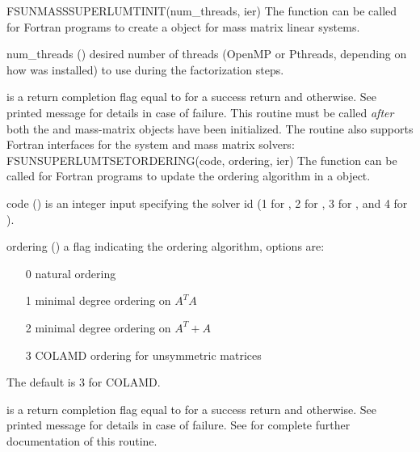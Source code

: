 {
  FSUNMASSSUPERLUMTINIT(num\_threads, ier)
}
{
  The function  can be called for Fortran programs
  to create a {\sunlinsolslumt} object for mass matrix linear systems.
}
{
  \begin{args}
  \item[num\_threads] ()
    desired number of threads (OpenMP or Pthreads, depending on how
    {\superlumt} was installed) to use during the factorization steps.
  \end{args}
}
{
   is a  return completion flag equal to  for a success
  return and  otherwise. See printed message for details in case
  of failure.
}
{
  This routine must be
  called \emph{after} both the {\nvector} and {\sunmatrix} mass-matrix
  objects have been initialized.
}
The  routine also supports Fortran
interfaces for the system and mass matrix solvers:
{
  FSUNSUPERLUMTSETORDERING(code, ordering, ier)
}
{
  The function  can be called for Fortran
  programs to update the ordering algorithm in a {\sunlinsolslumt} object.
}
{
  \begin{args}[ordering]
  \item[code] ()
    is an integer input specifying the solver id (1 for {\cvode}, 2
    for {\ida}, 3 for {\kinsol}, and 4 for {\arkode}).
  \item[ordering] ()
    a flag indicating the ordering algorithm, options are:
    \begin{itemize}
    \item[0] natural ordering
    \item[1] minimal degree ordering on $A^TA$
    \item[2] minimal degree ordering on $A^T+A$
    \item[3] COLAMD ordering for unsymmetric matrices
    \end{itemize}
    The default is 3 for COLAMD.
  \end{args}
}
{
   is a  return completion flag equal to  for a success
  return and  otherwise. See printed message for details in case
  of failure.
}
{
  See  for complete further
  documentation of this routine. 
}
